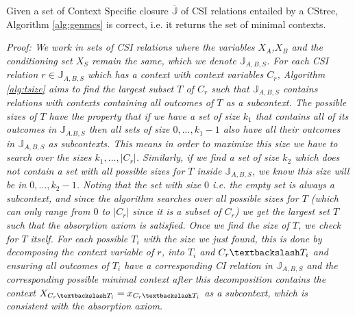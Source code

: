 \documentclass{tufte-book}
\begin{document}
\begin{theorem}\label{alg:genmcscorrectness}
Given a set of Context Specific closure $\mathbb{\overline{J}}$ of CSI relations entailed by a CStree, Algorithm \ref{alg:genmcs} is correct, i.e. it returns the set of minimal contexts.
\end{theorem}


\textit{Proof: We work in sets of CSI relations where the variables $X_A$,$X_B$ and the conditioning set $X_S$ remain the same, which we denote $\mathbb{J}_{A,B,S}$. For each CSI relation $r \in \mathbb{J}_{A,B,S}$ which has a context with context variables $C_r$, Algorithm \ref{alg:tsize} aims to find the largest subset $T$ of $C_r$ such that $\mathbb{J}_{A,B,S}$ contains relations with contexts containing all outcomes of $T$ as a subcontext. The possible sizes of $T$ have the property that if we have a set of size $k_1$ that contains all of its outcomes in $\mathbb{J}_{A.B,S}$ then all sets of size $0,...,k_1-1$ also have all their outcomes in $\mathbb{J}_{A,B,S}$ as subcontexts. This means in order to maximize this size we  have to search over the sizes $k_1,...,|C_r|$. Similarly, if we find a set of size $k_2$ which does not contain a set with all possible sizes for $T$ inside $\mathbb{J}_{A,B,S}$, we know this size will be in $0,...,k_2-1$. Noting that the set with size $0$ i.e. the empty set is always a subcontext, and since the algorithm searches over all possible sizes for $T$ (which can only range from $0$ to $|C_r|$ since it is a subset of $C_r$) we get the largest set $T$ such that the absorption axiom is satisfied. Once we find the size of $T$, we check for $T$ itself. For each possible $T_i$ with the size we just found, this is done by decomposing the context variable of $r$, into $T_i$ and $C_r\textbackslash T_i$ and ensuring all outcomes of $T_i$ have a corresponding CI relation in $\mathbb{J}_{A,B,S}$ and the corresponding possible minimal context after this decomposition contains the context $X_{C_r\textbackslash T_i} = x_{C_r \textbackslash T_i}$ as a subcontext, which is consistent with the absorption axiom.}
\end{document}
